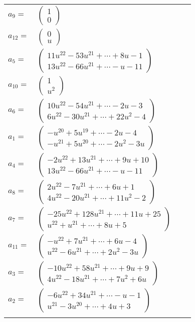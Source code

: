 \documentclass[1p]{elsarticle_modified}
\theoremstyle{definition}
\begin{document}
\begin{tabular}{m{7pt} m{180pt} m{7pt} m{180pt} }
\flushright $a_{9}=$&$\begin{pmatrix}1\\0\end{pmatrix}$ \\
\flushright $a_{12}=$&$\begin{pmatrix}0\\u\end{pmatrix}$ \\
\flushright $a_{5}=$&$\begin{pmatrix}11 u^{22}-53 u^{21}+\cdots+8 u-1\\13 u^{22}-66 u^{21}+\cdots- u-11\end{pmatrix}$ \\
\flushright $a_{10}=$&$\begin{pmatrix}1\\u^2\end{pmatrix}$ \\
\flushright $a_{6}=$&$\begin{pmatrix}10 u^{22}-54 u^{21}+\cdots-2 u-3\\6 u^{22}-30 u^{21}+\cdots+22 u^2-4\end{pmatrix}$ \\
\flushright $a_{1}=$&$\begin{pmatrix}- u^{20}+5 u^{19}+\cdots-2 u-4\\- u^{21}+5 u^{20}+\cdots-2 u^2-3 u\end{pmatrix}$ \\
\flushright $a_{4}=$&$\begin{pmatrix}-2 u^{22}+13 u^{21}+\cdots+9 u+10\\13 u^{22}-66 u^{21}+\cdots- u-11\end{pmatrix}$ \\
\flushright $a_{8}=$&$\begin{pmatrix}2 u^{22}-7 u^{21}+\cdots+6 u+1\\4 u^{22}-20 u^{21}+\cdots+11 u^2-2\end{pmatrix}$ \\
\flushright $a_{7}=$&$\begin{pmatrix}-25 u^{22}+128 u^{21}+\cdots+11 u+25\\u^{22}+u^{21}+\cdots+8 u+5\end{pmatrix}$ \\
\flushright $a_{11}=$&$\begin{pmatrix}- u^{22}+7 u^{21}+\cdots+6 u-4\\u^{22}-6 u^{21}+\cdots+2 u^2-3 u\end{pmatrix}$ \\
\flushright $a_{3}=$&$\begin{pmatrix}-10 u^{22}+58 u^{21}+\cdots+9 u+9\\4 u^{22}-18 u^{21}+\cdots+7 u^2+6 u\end{pmatrix}$ \\
\flushright $a_{2}=$&$\begin{pmatrix}-6 u^{22}+34 u^{21}+\cdots- u-1\\u^{21}-3 u^{20}+\cdots+4 u+3\end{pmatrix}$\\&\end{tabular}
\end{document}
